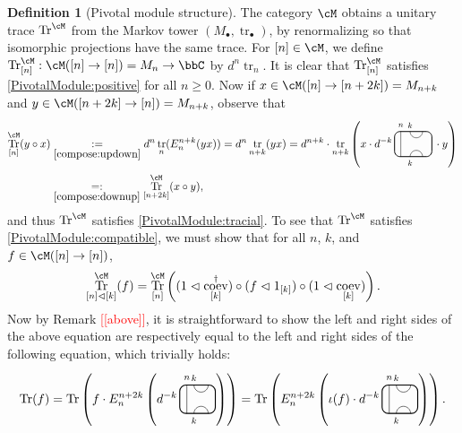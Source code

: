 \documentclass[11pt]{article}
\theoremstyle{plain}
\theoremstyle{definition}
\newtheorem{defn}[thm]{Definition}
\DeclareMathOperator{\coev}{coev}
\DeclareMathOperator{\Tr}{Tr}
\DeclareMathOperator{\tr}{tr}
\newcommand{\nn}[1]{\textcolor{red}{[[#1]]}}
\begin{document}
\begin{defn}[Pivotal module structure] 
\label{def:PivotalModuleFromMarkovTower}
The category $\cM$ obtains a unitary trace $\Tr^\cM$ from the Markov tower $(M_\bullet,\tr_\bullet)$, by renormalizing so that isomorphic projections have the same trace.
For $[n] \in \cM$, we define $\Tr^\cM_{[n]} : \cM([n] \to [n]) = M_n \to \bbC$ by $d^n \tr_n$.
It is clear that $\Tr^\cM_{[n]}$ satisfies \ref{PivotalModule:positive} for all $n\geq 0$.
Now if $x \in \cM([n] \to [n+ 2k])= M_{n+k}$ and $y\in \cM ([n+ 2k] \to [n]) = M_{n+ k}$, observe that 
\begin{align*}
\Tr^\cM_{[n]}(y\circ x)
&\underset{\ref{compose:updown}}{:=}
d^n\tr_n(E^{n+k}_n(yx))
=
d^n \tr_{n+k}(yx)
=
d^{n+k}
\cdot
\tr_{n+k}
\left(
x \cdot
d^{-k}\,
\begin{tikzpicture}[baseline = .3cm]
 \draw[thick, rounded corners = 5pt] (0,0) rectangle (1.2,.8);
 \draw (.2,0) -- (.2,.8);
 \draw (.5,.8) arc (-180:0:.2cm);
 \draw (.5,0) arc (180:0:.2cm);
 \node at (.2,1) {\scriptsize{$n$}};
 \node at (.5,1) {\scriptsize{$k$}};
 \node at (.5,-.2) {\scriptsize{$k$}};
\end{tikzpicture}\,
\cdot y
\right)
\\&\underset{\ref{compose:downup}}{=:}
\Tr^\cM_{[n+2k]}(x\circ y),
\end{align*}
and thus $\Tr^\cM$ satisfies \ref{PivotalModule:tracial}.
To see that $\Tr^\cM$ satisfies \ref{PivotalModule:compatible}, we must show that for all $n$, $k$, and $f\in\cM([n]\to[n])$,
 \[\Tr^\cM_{[n]\vartriangleleft[k]}(f)=\Tr^\cM_{[n]}\left((1\vartriangleleft\coev_{[k]}^\dag)\circ(f\vartriangleleft1_{[k]})\circ(1\vartriangleleft\coev_{[k]})\right).
 \]
 Now by Remark \nn{above}, it is straightforward to show the left and right sides of the above equation are respectively equal to the left and right sides of the following equation, which trivially holds:
  \[
  \Tr(f)
  =
  \Tr\left(f\cdot E^{n+2k}_n\left(d^{-k}\,
  \begin{tikzpicture}[baseline=.3cm]
   \draw (.2,0) -- (.2,.8);
   \node at (.2,1) {\scriptsize{$n$}};
   \draw (.4,.8) arc (-180:0:.2cm);
   \node at (.4,1) {\scriptsize{$k$}};
   \draw (.4,0) arc (180:0:.2cm);
   \node at (.4,-.2) {\scriptsize{$k$}};
   \draw[thick, rounded corners = 5pt] (0,0) rectangle (1,.8);
  \end{tikzpicture}
 \right)\right)
 =
 \Tr\left(E^{n+2k}_n\left(\iota(f)\cdot d^{-k}\,
  \begin{tikzpicture}[baseline=.3cm]
   \draw (.2,0) -- (.2,.8);
   \node at (.2,1) {\scriptsize{$n$}};
   \draw (.4,.8) arc (-180:0:.2cm);
   \node at (.4,1) {\scriptsize{$k$}};
   \draw (.4,0) arc (180:0:.2cm);
   \node at (.4,-.2) {\scriptsize{$k$}};
   \draw[thick, rounded corners = 5pt] (0,0) rectangle (1,.8);
  \end{tikzpicture}
 \right)\right)
 \text{.}
 \]
\end{defn}
\end{document}
